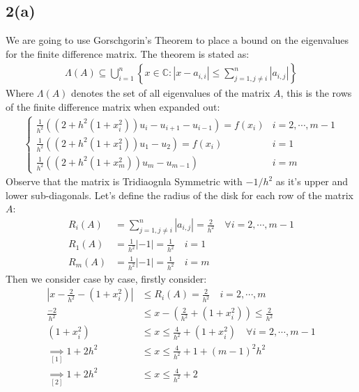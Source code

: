 \documentclass[]{article}
\begin{document}
    \subsection*{2(a)}
        We are going to use Gorschgorin's Theorem to place a bound on the eigenvalues for the finite difference matrix. The theorem is stated as: 
        \begin{align*}\tag{2.a.1}\label{eqn:2.a.1}
            \Lambda (A) \subseteq \bigcup_{i = 1}^n
            \left\lbrace
                x \in \mathbb{C}: | x - a_{i, i}| \le 
                \sum_{j = 1, j\neq i}^{n}| a_{i, j}|
            \right\rbrace
        \end{align*}
        Where $\Lambda(A)$ denotes the set of all eigenvalues of the matrix $A$, this is the rows of the finite difference matrix when expanded out: 
        \begin{align*}\tag{2.a.2}\label{eqn:2.a.2}
            \begin{cases}
                \frac{1}{h^2}\left(
                    (2 + h^2(1 + x_i^2))u_i - u_{i + 1} - u_{i - 1}
                \right) = f(x_i) &  i= 2, \cdots, m - 1
                \\
                \frac{1}{h^2}\left(
                    (2 + h^2(1 + x_1^2))u_1 - u_{2}
                \right)
                = f(x_i) &  i = 1
                \\
                \frac{1}{h^2}((2 + h^2(1 + x_m^2))u_m - u_{m - 1}) & i = m
            \end{cases}
        \end{align*}
        Observe that the matrix is Tridiaognla Symmetric with $-1/h^2$ as it's upper and lower sub-diagonals. 
        Let's define the radius of the disk for each row of the matrix $A$: 
        \begin{align*}\tag{2.a.3}\label{eqn:2.a.3}
            R_i (A) &= \sum_{j = 1, j\neq i}^{n}
                |a_{i, j}| = \frac{2}{h^2} \quad \forall i = 2, \cdots, m - 1
            \\
            R_1(A) &= \frac{1}{h^2}| -1| = \frac{1}{h^2} \quad i = 1
            \\
            R_m(A) &= \frac{1}{h^2}| -1| =  \frac{1}{h^2} \quad i = m
        \end{align*}
        Then we consider case by case, firstly consider: 
        \begin{align*}\tag{2.a.4}\label{eqn:2.a.4}
            \left|
                x - \frac{2}{h^2} - ( 1 + x_i^2)
            \right| 
            &\le  R_i(A) = \frac{2}{h^2} 
            \quad i = 2, \cdots, m
            \\
            \frac{-2}{h^2} &\le  
            x - \left(
                \frac{2}{h^2} + (1 + x_i^2)
            \right) \le \frac{2}{h^2}
            \\
            (1 + x_i^2) &\le  x \le \frac{4}{h^2} + (1 + x_i^2) \quad \forall i = 2, \cdots, m - 1
            \\ \underset{[1]}{\implies}
            1 + 2h^2 &\le x \le \frac{4}{h^2} + 1 + (m - 1)^2 h^2
            \\ \underset{[2]}{\implies}
            1 + 2h^2 &\le x \le \frac{4}{h^2} + 2
        \end{align*}
\end{document}
